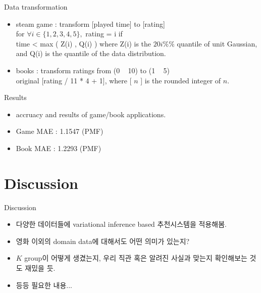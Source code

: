 \documentclass{beamer}
\begin{document}
\begin{frame}{Data transformation}
    \begin{itemize}
        \item steam game : transform [played time] to [rating] \\
	      for $\forall i \in \{1,2,3,4,5\},$ rating = i if \\
	      time < max ( Z(i) , Q(i) ) where Z(i) is the $20 i \%\%$ quantile of unit Gaussian, 
	      and Q(i) is the quantile of the data distribution.
	\item books : transform ratings from (0 ~ 10) to (1 ~ 5) \\
	      original [rating / 11 * 4 + 1], where [ $n$ ] is the rounded integer of $n$.
    \end{itemize}
\end{frame}

\begin{frame}{Results}
	\begin{itemize}
		\item accruacy and results of game/book applications.
		\item Game MAE : 1.1547 (PMF)
		\item Book MAE : 1.2293 (PMF)
	\end{itemize}
\end{frame}

\section{Discussion}
\begin{frame}{Discussion}
    \begin{itemize}
        \item 다양한 데이터들에 variational inference based 추천시스템을 적용해봄.
        \item 영화 이외의 domain data에 대해서도 어떤 의미가 있는지?
        \item $K$ group이 어떻게 생겼는지, 우리 직관 혹은 알려진 사실과 맞는지 확인해보는 것도 재밌을 듯.
        \item 등등 필요한 내용...
    \end{itemize}
\end{frame}
\end{document}
